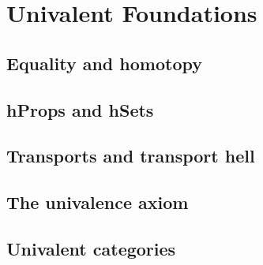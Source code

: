 \chapter{Univalent Foundations}

\section{Equality and homotopy}
\TODO
\section{hProps and hSets}
\TODO
\section{Transports and transport hell}
\TODO
\section{The univalence axiom}
\TODO
\section{Univalent categories}
\TODO
